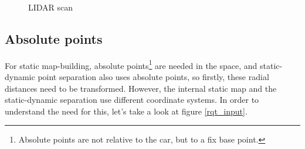 \begin{figure}[!ht]
    \centering
    \caption{LIDAR scan}
    \label{lidar_scan}
\end{figure}

\subsection{Absolute points}
For static map-building, absolute points\footnote{Absolute points are not relative to the car, but to a fix base point.} are needed in the space, and static-dynamic point separation also uses absolute points, so firstly, these radial distances need to be transformed. However, the internal static map and the static-dynamic separation use different coordinate systems. In order to understand the need for this, let's take a look at figure \ref{rqt_input}.


